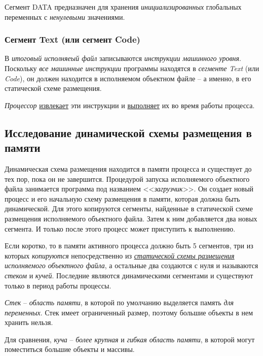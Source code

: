 \documentclass[%
	11pt,
	a4paper,
	utf8,
		]{article}
\begin{document}
Сегмент DATA предназначен для хранения \emph{инициализированных} глобальных переменных с \emph{ненулевыми} значениями.

\subsubsection{Сегмент Text (или сегмент Code)}

В \emph{итоговый исполняеый файл} записываются \emph{инструкции машинного уровня}. Поскольку \emph{все машинные инструкции} программы находятся в \emph{сегменте Text} (или \emph{Code}), он должен находится в исполняемом объектном файле -- а именно, в его статической схеме размещения. 

\emph{Процессор} \underline{извлекает} эти инструкции и \underline{выполняет} их во время работы процесса.

\subsection{Исследование динамической схемы размещения в памяти}

Динамическая схема размещения находится в памяти процесса и существует до тех пор, пока он не завершится. Процедурой запуска исполняемого объектного файла занимается программа под названием <<\emph{загрузчик}>>. Он создает новый процесс и его начальную схему размещения в памяти, которая должна быть динамической. Для этого копируются сегменты, найденные в статической схеме размещения исполняемого объектного файла. Затем к ним добавляется два новых сегмента. И только после этого процесс может приступить к выполнению.

Если коротко, то в памяти активного процесса должно быть 5 сегментов, три из которых \emph{копируются} непосредственно из \underline{\itshape статической схемы размещения} \emph{исполняемого объектного файла}, а остальные два создаются с нуля и называются \emph{стеком} и \emph{кучей}. Последние являются динамическими сегментами и существуют только в период работы процессы. 

\emph{Стек} -- \emph{область памяти}, в которой по умолчанию выделяется память \emph{для переменных}. Стек имеет ограниченный размер, поэтому большие объекты в нем хранить нельзя.

Для сравнения, \emph{куча} -- \emph{более крупная} и \emph{гибкая область памяти}, в которой могут поместиться большие объекты и массивы.

\end{document}

